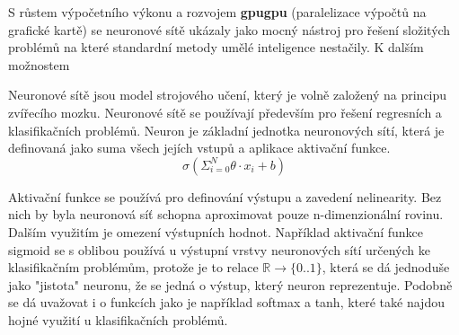S růstem výpočetního výkonu a rozvojem \textbf{gpugpu} (paralelizace výpočtů na grafické kartě) se neuronové sítě ukázaly jako mocný nástroj pro řešení složitých problémů na které standardní metody umělé inteligence nestačily.
K dalším možnostem 



Neuronové sítě jsou model strojového učení, který je volně založený na principu zvířecího mozku.  \cite[s.~41]{fundementalsOfDeepLearning}
Neuronové sítě se používají především pro řešení regresních a klasifikačních problémů.
Neuron je základní jednotka neuronových sítí, která je definovaná jako suma všech jejích vstupů a aplikace aktivační funkce.
	$$\sigma(\Sigma_{i=0}^{N} \theta \cdot x_{i} + b)$$

Aktivační funkce se používá pro definování výstupu a zavedení nelinearity. Bez nich by byla neuronová síť schopna aproximovat pouze n-dimenzionální rovinu. \cite[s.~65]{fundementalsOfDeepLearning} \\
Dalším využitím je omezení výstupních hodnot. Například aktivační funkce sigmoid se s oblibou používá u výstupní vrstvy neuronových sítí určených ke klasifikačním problémům, protože je to relace $\mathbb{R} \rightarrow \{0..1\}$, která se dá jednoduše jako "jistota" neuronu, že se jedná o výstup, který neuron reprezentuje. Podobně se dá uvažovat i o funkcích jako je například softmax a tanh, které také najdou hojné využití u klasifikačních problémů.

